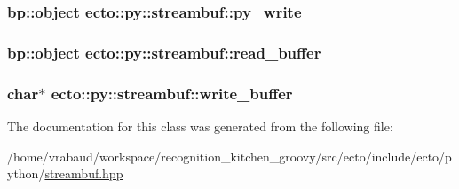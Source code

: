 \hypertarget{classecto_1_1py_1_1streambuf_aad739c2392d3c8f0de7d44719c7cc37a}{
\subsubsection[{py\-\_\-write}]{\setlength{\rightskip}{0pt plus 5cm}bp\-::object {\bf ecto\-::py\-::streambuf\-::py\-\_\-write}}}\label{classecto_1_1py_1_1streambuf_aad739c2392d3c8f0de7d44719c7cc37a}
\hypertarget{classecto_1_1py_1_1streambuf_ac239012691e5d3485572159a53600005}{
\subsubsection[{read\-\_\-buffer}]{\setlength{\rightskip}{0pt plus 5cm}bp\-::object {\bf ecto\-::py\-::streambuf\-::read\-\_\-buffer}}}\label{classecto_1_1py_1_1streambuf_ac239012691e5d3485572159a53600005}
\hypertarget{classecto_1_1py_1_1streambuf_a331e541fac616ac9ac3a81fb117057c6}{
\subsubsection[{write\-\_\-buffer}]{\setlength{\rightskip}{0pt plus 5cm}char$\ast$ {\bf ecto\-::py\-::streambuf\-::write\-\_\-buffer}}}\label{classecto_1_1py_1_1streambuf_a331e541fac616ac9ac3a81fb117057c6}


\-The documentation for this class was generated from the following file\-:\begin{DoxyCompactItemize}
\item 
/home/vrabaud/workspace/recognition\-\_\-kitchen\-\_\-groovy/src/ecto/include/ecto/python/\hyperlink{streambuf_8hpp}{streambuf.\-hpp}\end{DoxyCompactItemize}
